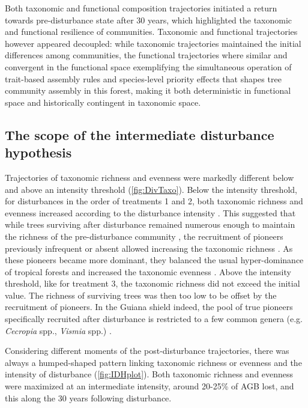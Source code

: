 \documentclass[fleqn,10pt]{ArtEcoFoG} %
\begin{document}
Both taxonomic and functional composition trajectories initiated a
return towards pre-disturbance state after 30 years, which highlighted
the taxonomic and functional resilience of communities. Taxonomic and
functional trajectories however appeared decoupled: while taxonomic
trajectories maintained the initial differences among communities, the
functional trajectories where similar and convergent in the functional
space \citep{Fukami2005} exemplifying the simultaneous operation of
trait-based assembly rules and species-level priority effects that
shapes tree community assembly in this forest, making it both
deterministic in functional space and historically contingent in
taxonomic space.

\subsection{The scope of the intermediate disturbance
hypothesis}\label{the-scope-of-the-intermediate-disturbance-hypothesis}

Trajectories of taxonomic richness and evenness were markedly different
below and above an intensity threshold (\ref{fig:DivTaxo}). Below the
intensity threshold, for disturbances in the order of treatments 1 and
2, both taxonomic richness and evenness increased according to the
disturbance intensity \citep{Martin2015, Chaudhary2016}. This suggested
that while trees surviving after disturbance remained numerous enough to
maintain the richness of the pre-disturbance community
\citep{Bongers2009}, the recruitment of pioneers previously infrequent
or absent allowed increasing the taxonomic richness
\citep{Martin2015, Chaudhary2016}. As these pioneers became more
dominant, they balanced the usual hyper-dominance of tropical forests
and increased the taxonomic evenness \citep{Baraloto2012a}. Above the
intensity threshold, like for treatment 3, the taxonomic richness did
not exceed the initial value. The richness of surviving trees was then
too low to be offset by the recruitment of pioneers. In the Guiana
shield indeed, the pool of true pioneers specifically recruited after
disturbance is restricted to a few common genera (e.g. \emph{Cecropia}
spp., \emph{Vismia} spp.) \citep{Guitet2018}.

Considering different moments of the post-disturbance trajectories,
there was always a humped-shaped pattern linking taxonomic richness or
evenness and the intensity of disturbance (\ref{fig:IDHplot}). Both
taxonomic richness and evenness were maximized at an intermediate
intensity, around 20-25\% of AGB lost, and this along the 30 years
following disturbance.
\end{document}
